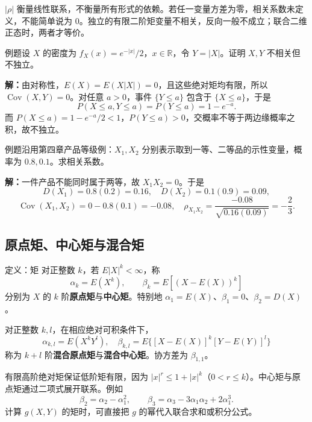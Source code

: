 \documentclass[UTF8,fontset=none,zihao=-4,a4paper]{ctexart}
\newcommand{\term}[1]{\textbf{#1}}
\newcommand{\example}[1]{\begin{infobox}{例题}#1\end{infobox}}
\newcommand{\solution}{\par\noindent\textbf{解：}}
\begin{document}
$|\rho|$ 衡量线性联系，不衡量所有形式的依赖。若任一变量方差为零，相关系数未定义，不能简单说为 $0$。独立的有限二阶矩变量不相关，反向一般不成立；联合二维正态时，两者才等价。
\example{设 $X$ 的密度为 $f_X(x)=e^{-|x|}/2$，$x\in\mathbb R$，令 $Y=|X|$。证明 $X,Y$ 不相关但不独立。}
\solution 由对称性，$E(X)=E(X|X|)=0$，且这些绝对矩均有限，所以 $\operatorname{Cov}(X,Y)=0$。对任意 $a>0$，事件 $\{Y\le a\}$ 包含于 $\{X\le a\}$，于是
\[
P(X\le a,Y\le a)=P(Y\le a)=1-e^{-a}.
\]
而 $P(X\le a)=1-e^{-a}/2<1$，$P(Y\le a)>0$，交概率不等于两边缘概率之积，故不独立。
\example{沿用第四章产品等级例：$X_1,X_2$ 分别表示取到一等、二等品的示性变量，概率为 $0.8,0.1$。求相关系数。}
\solution 一件产品不能同时属于两等，故 $X_1X_2=0$。于是
\[
D(X_1)=0.8(0.2)=0.16,\quad D(X_2)=0.1(0.9)=0.09,
\]
\[
\operatorname{Cov}(X_1,X_2)=0-0.8(0.1)=-0.08,
\quad \rho_{X_1X_2}=\frac{-0.08}{\sqrt{0.16(0.09)}}=-\frac23.
\]

\subsection{原点矩、中心矩与混合矩}
\begin{infobox}{定义：矩}
对正整数 $k$，若 $E|X|^k<\infty$，称
\[
\alpha_k=E(X^k),\qquad \beta_k=E[(X-E(X))^k]
\]
分别为 $X$ 的 $k$ 阶\term{原点矩}与\term{中心矩}。特别地 $\alpha_1=E(X)$、$\beta_1=0$、$\beta_2=D(X)$。

对正整数 $k,l$，在相应绝对可积条件下，
\[
\alpha_{k,l}=E(X^kY^l),\quad
\beta_{k,l}=E\{[X-E(X)]^k[Y-E(Y)]^l\}
\]
称为 $k+l$ 阶\term{混合原点矩}与\term{混合中心矩}。协方差为 $\beta_{1,1}$。
\end{infobox}
有限高阶绝对矩保证低阶矩有限，因为 $|x|^r\le1+|x|^k$（$0<r\le k$）。中心矩与原点矩通过二项式展开联系。例如
\[
\beta_2=\alpha_2-\alpha_1^2,\qquad
\beta_3=\alpha_3-3\alpha_1\alpha_2+2\alpha_1^3.
\]
计算 $g(X,Y)$ 的矩时，可直接把 $g$ 的幂代入联合求和或积分公式。
\end{document}

